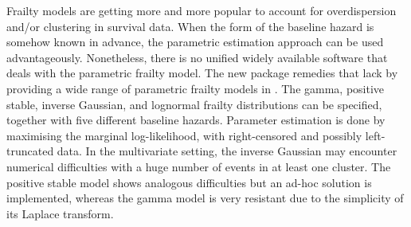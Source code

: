 Frailty models are getting more and more popular to account for overdispersion and/or clustering in survival data.
When the form of the baseline hazard is somehow known in advance, the parametric estimation approach can be used advantageously.
Nonetheless, there is no unified widely available software that deals with the parametric frailty model.
The new  package remedies that lack by providing a wide range of parametric frailty models in .
The gamma, positive stable, inverse Gaussian, and lognormal
    frailty distributions can be specified, together with five different baseline hazards.
Parameter estimation is done by maximising the marginal log-likelihood, with right-censored and possibly left-truncated data.
In the multivariate setting, the inverse Gaussian may encounter numerical difficulties with a huge number of events in at least one cluster.
The positive stable model shows analogous difficulties but an ad-hoc solution is implemented, whereas the gamma model is very resistant due to the simplicity of its Laplace transform.